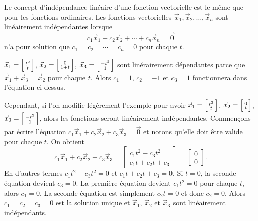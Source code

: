 Le concept d’indépendance linéaire d’une fonction vectorielle est le même que pour les fonctions ordinaires. Les fonctions vectorielles
$\vec{x}_1,\vec{x}_2,\ldots,\vec{x}_n$ sont linéairement indépendantes
lorsque
\begin{equation*}
c_1 \vec{x}_1 + c_2 \vec{x}_2 + \cdots + c_n \vec{x}_n  = \vec{0}
\end{equation*}
n’a pour solution que $c_1 = c_2 = \cdots = c_n = 0$ pour chaque $t$.

\begin{example}
$\vec{x}_1 = \Bigl[ \begin{smallmatrix} t^2 \\ t \end{smallmatrix} \Bigr]$,
$\vec{x}_2 = \Bigl[ \begin{smallmatrix} 0 \\ 1+t \end{smallmatrix} \Bigr]$,
$\vec{x}_3 = \Bigl[ \begin{smallmatrix} -t^2 \\ 1 \end{smallmatrix} \Bigr]$
sont linérairement dépendantes parce que
$\vec{x}_1 + \vec{x}_3 = \vec{x}_2$ pour chaque $t$. Alors $c_1 =
1$, $c_2 = -1$ et $c_3 = 1$ fonctionnera dans l’équation ci-dessus.

Cependant, si l'on modifie légèrement l’exemple pour avoir
$\vec{x}_1 = \Bigl[ \begin{smallmatrix} t^2 \\ t \end{smallmatrix} \Bigr]$,
$\vec{x}_2 = \Bigl[ \begin{smallmatrix} 0 \\ t \end{smallmatrix} \Bigr]$,
$\vec{x}_3 = \Bigl[ \begin{smallmatrix} -t^2 \\ 1 \end{smallmatrix}
\Bigr]$,
alors les fonctions seront linéairement indépendantes. Commençons par écrire l'équation
$c_1 \vec{x}_1 + c_2 \vec{x}_2 + c_3 \vec{x}_3  = \vec{0}$ et notons qu’elle doit être valide pour chaque $t$. On obtient
\begin{equation*}
c_1 \vec{x}_1 + c_2 \vec{x}_2 + c_3 \vec{x}_3
=
\begin{bmatrix}
c_1 t^2 - c_3 t^2
\\
c_1 t + c_2 t + c_3 
\end{bmatrix}
=
\begin{bmatrix}
0
\\
0
\end{bmatrix} .
\end{equation*}
En d’autres termes
$c_1 t^2 - c_3 t^2 = 0$ et
$c_1 t + c_2 t + c_3 = 0$.
Si $t = 0$, la seconde équation devient $c_3 = 0$. La première équation devient
$c_1 t^2 = 0$ pour chaque $t$, alors $c_1 = 0$.  La seconde équation est simplement $c_2 t = 0$ et donc $c_2 = 0$.  Alors $c_1 = c_2 = c_3 = 0$
est la solution unique et $\vec{x}_1$,
$\vec{x}_2$ et $\vec{x}_3$ sont linéairement indépendants.
\end{example}

